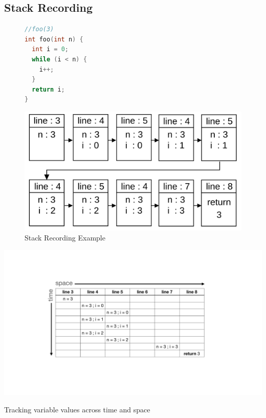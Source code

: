 \documentclass[english,submission]{programming}
\begin{document}
\label{sec:stack-recording}

\subsection{Stack Recording}

\begin{figure}[h]
  \centering
  \begin{minipage}{0.25\textwidth}
    \centering
    \begin{lstlisting}[language=C]
//foo(3)
int foo(int n) {
  int i = 0;
  while (i < n) {
    i++;
  }
  return i;
}
    \end{lstlisting}
  \end{minipage}
  \hfill
  \begin{minipage}{0.7\textwidth}
    \centering
    \includegraphics[width=0.8\linewidth]{img/stackrecording_chain.png}
  \end{minipage}
  \caption{Stack Recording Example}
  \label{fig:stack-recording}
\end{figure}

\begin{table}[t]
  \centering
  \includegraphics[width=\textwidth]{img/matrix.pdf}
  \caption{Tracking variable values across time and space}
\end{table}
\end{document}
